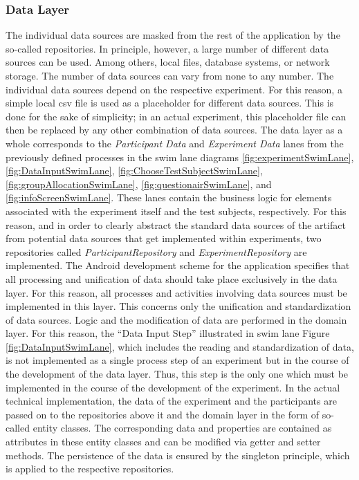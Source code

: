 \subsubsection{Data Layer}

The individual data sources are masked from the rest of the application by the so-called repositories. In principle, however, a large number of different data sources can be used. Among others, local files, database systems, or network storage. The number of data sources can vary from none to any number. The individual data sources depend on the respective experiment. For this reason, a simple local \ac{csv} file is used as a placeholder for different data sources. This is done for the sake of simplicity; in an actual experiment, this placeholder file can then be replaced by any other combination of data sources. The data layer as a whole corresponds to the \textit{Participant Data} and \textit{Experiment Data} lanes from the previously defined processes in the swim lane diagrams \ref{fig:experimentSwimLane}, \ref{fig:DataInputSwimLane}, \ref{fig:ChooseTestSubjectSwimLane}, \ref{fig:groupAllocationSwimLane}, \ref{fig:questionairSwimLane}, and \ref{fig:infoScreenSwimLane}. These lanes contain the business logic for elements associated with the experiment itself and the test subjects, respectively. For this reason, and in order to clearly abstract the standard data sources of the artifact from potential data sources that get implemented within experiments, two repositories called \textit{ParticipantRepository} and \textit{ExperimentRepository} are implemented. The Android development scheme for the application specifies that all processing and unification of data should take place exclusively in the data layer. For this reason, all processes and activities involving data sources must be implemented in this layer. This concerns only the unification and standardization of data sources. Logic and the modification of data are performed in the domain layer. For this reason, the \enquote{Data Input Step} illustrated in swim lane Figure \ref{fig:DataInputSwimLane}, which includes the reading and standardization of data, is not implemented as a single process step of an experiment but in the course of the development of the data layer. Thus, this step is the only one which must be implemented in the course of the development of the experiment. In the actual technical implementation, the data of the experiment and the participants are passed on to the repositories above it and the domain layer in the form of so-called entity classes. The corresponding data and properties are contained as attributes in these entity classes and can be modified via getter and setter methods. The persistence of the data is ensured by the singleton principle, which is applied to the respective repositories.

